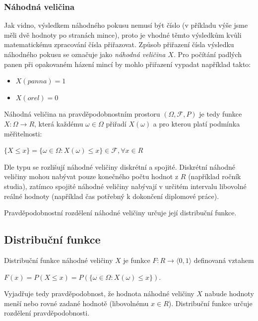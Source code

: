 \documentclass[thesis=M,czech]{FITthesis}[2014/05/07]
\begin{document}
\subsubsection{Náhodná veličina}
\label{randomvel}
\cite{pst1} Jak vidno, výsledkem náhodného pokusu nemusí být číslo (v příkladu výše jsme měli dvě hodnoty po stranách mince), proto je vhodné těmto výsledkům kvůli matematickému zpracování čísla přiřazovat. Způsob přiřazení čísla výsledku náhodného pokusu se označuje jako \emph{náhodná veličina $X$}. Pro počítání padlých panen při opakovaném házení mincí by mohlo přiřazení vypadat například takto:

\begin{itemize}
	\item $X(panna) = 1$
	\item $X(orel) = 0$
\end{itemize}

Náhodná veličina na pravděpodobnostním prostoru $(\Omega,\mathcal{F},P)$ je tedy funkce $X: \Omega \to R$, která každému $\omega \in \Omega$ přiřadí $X(\omega)$ a pro kterou platí podmínka měřitelnosti:

\begin{center}
$\{ X \leq x \} = \{ \omega \in \Omega: X(\omega) \leq x \} \in \mathcal{F}, \forall x \in R$
\end{center}

Dle typu se rozlišují náhodné veličiny diskrétní a spojité. Diskrétní náhodné veličiny mohou nabývat pouze konečného počtu hodnot z $R$ (například ročník studia), zatímco spojité náhodné veličiny nabývají v určitém intervalu libovolné reálné hodnoty (například čas potřebný k dokončení diplomové práce). 

Pravděpodobnostní rozdělení náhodné veličiny určuje její distribuční funkce. 

\subsection{Distribuční funkce}
\label{cdf}
Distribuční funkce náhodné veličiny $X$ je funkce $F: R \to \langle0,1\rangle$ definovaná vztahem 

\begin{center}
$F(x) = P(X \leq x) = P(\{ \omega \in \Omega: X(\omega) \leq x \})$.
\end{center}

Vyjadřuje tedy pravděpodobnost, že hodnota náhodné veličiny $X$ nabude hodnoty menší nebo rovné zadané hodnotě (libovolnému $x \in R$). Distribuční funkce určuje rozdělení pravděpodobnosti.
\end{document}
